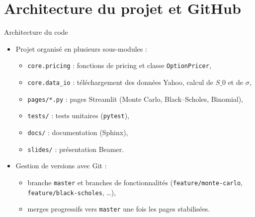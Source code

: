 \documentclass[aspectratio=169]{beamer}
\begin{document}
\section{Architecture du projet et GitHub}

\begin{frame}{Architecture du code}
  \begin{itemize}
    \item Projet organis\'e en plusieurs sous-modules :
    \begin{itemize}
      \item \texttt{core.pricing} : fonctions de pricing et classe \texttt{OptionPricer},
      \item \texttt{core.data\_io} : t\'el\'echargement des donn\'ees Yahoo, calcul de $S\_0$ et de $\sigma$,
      \item \texttt{pages/*.py} : pages Streamlit (Monte Carlo, Black--Scholes, Binomial),
      \item \texttt{tests/} : tests unitaires (\texttt{pytest}),
      \item \texttt{docs/} : documentation (Sphinx),
      \item \texttt{slides/} : pr\'esentation Beamer.
    \end{itemize}
    \item Gestion de versions avec Git :
    \begin{itemize}
      \item branche \texttt{master} et branches de fonctionnalit\'es (\texttt{feature/monte-carlo}, \texttt{feature/black-scholes}, \dots),
      \item merges progressifs vers \texttt{master} une fois les pages stabilis\'ees.
    \end{itemize}
  \end{itemize}
\end{frame}
\end{document}
